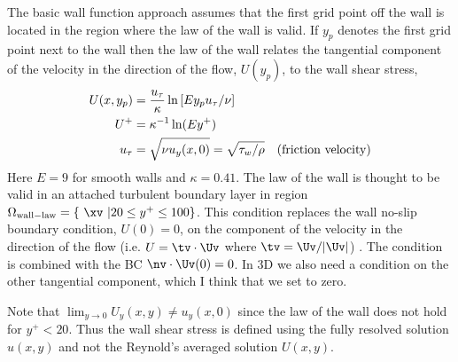 The basic wall function approach assumes that the first grid point off the
wall is located in the region where the law of the wall is valid.
If $y_p$ denotes the first grid point next to the wall then the law of the
wall relates the tangential component of the velocity in the direction of the flow, $U(y_p)$,
to the wall shear stress, 
\begin{align}
  U(x,y_p) &= {u_\tau \over\kappa} \ln\left[ E y_p u_\tau/\nu \right] \label{eq:lawOfWall2} \\
    U^+    & = \kappa^{-1} \ln(E y^+) \\ 
       u_\tau & = \sqrt{ \nu u_y(x,0)} = \sqrt{\tau_w/\rho} \quad\mbox{(friction velocity)}
\end{align}
Here $E=9$ for smooth walls and $\kappa=0.41$. 
The law of the wall is thought to be valid in an attached turbulent boundary layer 
in region $\OmegaWallLaw = \{ ~\xv~ \vert 20 \le y^+ \le 100\}$. 
This condition replaces the wall no-slip boundary condition, $U(0)=0$,   on the component of the velocity
in the direction of the flow (i.e. $U = \tv\cdot\Uv$ where $\tv=\Uv/\vert \Uv \vert$) . 
The condition is combined with the BC $\nv\cdot\Uv(0)=0$. In 3D we also need a condition on
the other tangential component, which I think that we set to zero.

Note that $\lim_{y\rightarrow 0} U_y(x,y) \ne u_y(x,0)$ since the law of the wall does not hold for $y^+ < 20$.
Thus the wall shear stress is defined using the fully resolved solution $u(x,y)$ and not the Reynold's averaged solution $U(x,y)$.



